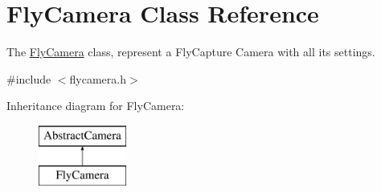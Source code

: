 \hypertarget{class_fly_camera}{\section{Fly\-Camera Class Reference}
\label{class_fly_camera}
}


The \hyperlink{class_fly_camera}{Fly\-Camera} class, represent a Fly\-Capture Camera with all its settings.  




{\ttfamily \#include $<$flycamera.\-h$>$}

Inheritance diagram for Fly\-Camera\-:\begin{figure}[H]
\begin{center}
\leavevmode
\includegraphics[height=2.000000cm]{class_fly_camera}
\end{center}
\end{figure}

